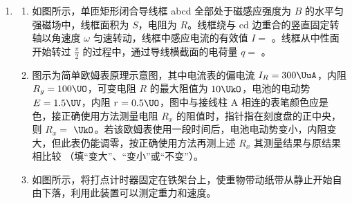 \documentclass[\gkver]{gaokaozhenti}
\begin{document}
\begin{enumerate}
{
}

\item
\begin{enumerate}
	\item
	如图所示，单匝矩形闭合导线框 abcd 全部处于磁感应强度为 $B$ 的水平匀强磁场中，线框面积为 $S$，电阻为 $R$。线框绕与 cd 边重合的竖直固定转轴以角速度 $\omega$ 匀速转动，线框中感应电流的有效值 $I=$ \tkanswer[1.6cm]{}。线框从中性面开始转过 $\frac{\pi}{2}$ 的过程中，通过导线横截面的电荷量 $q=$ \tkanswer[1.6cm]{}。


	\item
	图示为简单欧姆表原理示意图，其中电流表的偏电流 $I_{R}=300\UuA$，内阻 $R_{g}=100\UO$，可变电阻 $R$ 的最大阻值为 $10\UkO$，电池的电动势 $E=1.5\UV$，内阻 $r=0.5\UO$，图中与接线柱 A 相连的表笔颜色应是 \tkanswer[1.6cm]{} 色，接正确使用方法测量电阻 $R_{x}$ 的阻值时，指针指在刻度盘的正中央，则 $R_{x}=$ \tkanswer[1.2cm]{} $\UkO$。若该欧姆表使用一段时间后，电池电动势变小，内阻变大，但此表仍能调零，按正确使用方法再测上述 $R_{x}$ 其测量结果与原结果相比较 \tkanswer[1.6cm]{}（填“变大”、“变小”或“不变”）。


	\item
	如图所示，将打点计时器固定在铁架台上，使重物带动纸带从静止开始自由下落，利用此装置可以测定重力和速度。


\end{enumerate}
\end{enumerate}
\end{document}
